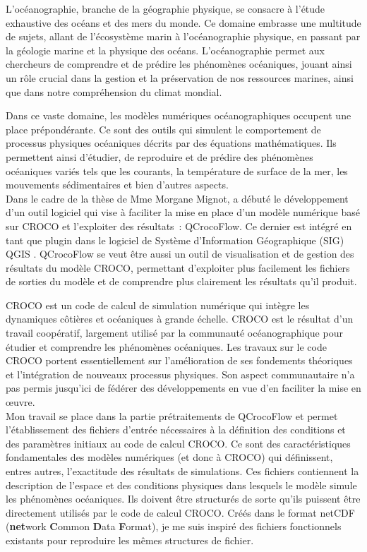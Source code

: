 
L'océanographie, branche de la géographie physique, se consacre à l'étude exhaustive des océans et des mers du monde. Ce domaine embrasse une multitude de sujets, allant de l'écosystème marin à l'océanographie physique, en passant par la géologie marine et la physique des océans. L'océanographie permet aux chercheurs de comprendre et de prédire les phénomènes océaniques, jouant ainsi un rôle crucial dans la gestion et la préservation de nos ressources marines, ainsi que dans notre compréhension du climat mondial.

Dans ce vaste domaine, les modèles numériques océanographiques occupent une place prépondérante. Ce sont des outils qui simulent le comportement de processus physiques océaniques décrits par des équations mathématiques. Ils permettent ainsi d'étudier, de reproduire et de prédire des phénomènes océaniques variés tels que les courants, la température de surface de la mer, les mouvements sédimentaires et bien d'autres aspects.\\

Dans le cadre de la thèse de Mme Morgane Mignot, a débuté le développement d'un outil logiciel qui vise à faciliter la mise en place d'un modèle numérique basé sur CROCO et l'exploiter des résultats~: QCrocoFlow. Ce dernier est intégré en tant que plugin dans le logiciel de Système d'Information Géographique (SIG) QGIS \citep{QGIS}. QCrocoFlow se veut être aussi un outil de visualisation et de gestion des résultats du modèle CROCO, permettant d'exploiter plus facilement les fichiers de sorties du modèle et de comprendre plus clairement les résultats qu'il produit.

CROCO est un code de calcul de simulation numérique qui intègre les dynamiques côtières et océaniques à grande échelle. CROCO est le résultat d'un travail coopératif, largement utilisé par la communauté océanographique pour étudier et comprendre les phénomènes océaniques. Les travaux sur le code CROCO portent essentiellement sur l'amélioration de ses fondements théoriques et l'intégration de nouveaux processus physiques. Son aspect communautaire n'a pas permis jusqu'ici de fédérer des développements en vue d'en faciliter la mise en \oe{uvre}.\\

Mon travail se place dans la partie \og prétraitements \fg{} de QCrocoFlow et permet l'établissement des fichiers d'entrée nécessaires à la définition des conditions et des paramètres initiaux au code de calcul CROCO. Ce sont des caractéristiques fondamentales des modèles numériques (et donc à CROCO) qui définissent, entres autres, l'exactitude des résultats de simulations. Ces fichiers contiennent la description de l'espace et des conditions physiques dans lesquels le modèle simule les phénomènes océaniques. Ils doivent être structurés de sorte qu'ils puissent être directement utilisés par le code de calcul CROCO. Créés dans le format netCDF (\textbf{net}work \textbf{C}ommon \textbf{D}ata \textbf{F}ormat), je me suis inspiré des fichiers fonctionnels existants pour reproduire les mêmes structures de fichier.\\

